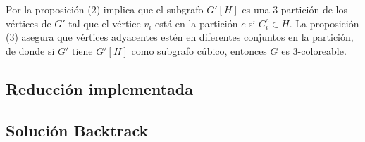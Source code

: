 \documentclass{article}
\begin{document}
Por la proposici\'on (2) implica que el subgrafo $G'[H]$ es una $3$-partici\'on de los v\'ertices de $G'$ tal que el v\'ertice
$v_i$ est\'a en la partici\'on $c$ si $C_i^c \in H$. La proposici\'on (3) asegura que v\'ertices adyacentes est\'en en diferentes conjuntos en la partici\'on, de donde
si $G'$ tiene $G'[H]$ como subgrafo c\'ubico, entonces $G$ es $3$-coloreable. \\ 

\subsection*{Reducci\'on implementada}
\subsection*{Soluci\'on Backtrack}
\end{document}
